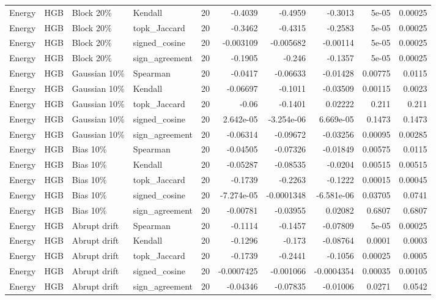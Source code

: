 \begin{tabular}{llllrrrrrr}
Energy & HGB & Block 20\% & Kendall & 20 & -0.4039 & -0.4959 & -0.3013 & 5e-05 & 0.00025 \\
Energy & HGB & Block 20\% & topk\_Jaccard & 20 & -0.3462 & -0.4315 & -0.2583 & 5e-05 & 0.00025 \\
Energy & HGB & Block 20\% & signed\_cosine & 20 & -0.003109 & -0.005682 & -0.00114 & 5e-05 & 0.00025 \\
Energy & HGB & Block 20\% & sign\_agreement & 20 & -0.1905 & -0.246 & -0.1357 & 5e-05 & 0.00025 \\
Energy & HGB & Gaussian 10\% & Spearman & 20 & -0.0417 & -0.06633 & -0.01428 & 0.00775 & 0.0115 \\
Energy & HGB & Gaussian 10\% & Kendall & 20 & -0.06697 & -0.1011 & -0.03509 & 0.00115 & 0.0023 \\
Energy & HGB & Gaussian 10\% & topk\_Jaccard & 20 & -0.06 & -0.1401 & 0.02222 & 0.211 & 0.211 \\
Energy & HGB & Gaussian 10\% & signed\_cosine & 20 & 2.642e-05 & -3.254e-06 & 6.669e-05 & 0.1473 & 0.1473 \\
Energy & HGB & Gaussian 10\% & sign\_agreement & 20 & -0.06314 & -0.09672 & -0.03256 & 0.00095 & 0.00285 \\
Energy & HGB & Bias 10\% & Spearman & 20 & -0.04505 & -0.07326 & -0.01849 & 0.00575 & 0.0115 \\
Energy & HGB & Bias 10\% & Kendall & 20 & -0.05287 & -0.08535 & -0.0204 & 0.00515 & 0.00515 \\
Energy & HGB & Bias 10\% & topk\_Jaccard & 20 & -0.1739 & -0.2263 & -0.1222 & 0.00015 & 0.00045 \\
Energy & HGB & Bias 10\% & signed\_cosine & 20 & -7.274e-05 & -0.0001348 & -6.581e-06 & 0.03705 & 0.0741 \\
Energy & HGB & Bias 10\% & sign\_agreement & 20 & -0.00781 & -0.03955 & 0.02082 & 0.6807 & 0.6807 \\
Energy & HGB & Abrupt drift & Spearman & 20 & -0.1114 & -0.1457 & -0.07809 & 5e-05 & 0.00025 \\
Energy & HGB & Abrupt drift & Kendall & 20 & -0.1296 & -0.173 & -0.08764 & 0.0001 & 0.0003 \\
Energy & HGB & Abrupt drift & topk\_Jaccard & 20 & -0.1739 & -0.2441 & -0.1056 & 0.00025 & 0.0005 \\
Energy & HGB & Abrupt drift & signed\_cosine & 20 & -0.0007425 & -0.001066 & -0.0004354 & 0.00035 & 0.00105 \\
Energy & HGB & Abrupt drift & sign\_agreement & 20 & -0.04346 & -0.07835 & -0.01006 & 0.0271 & 0.0542 \\

\end{tabular}
